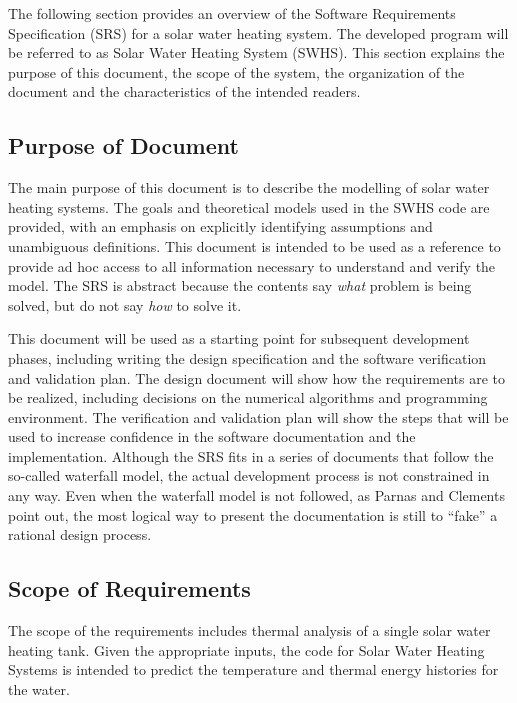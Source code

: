 \documentclass[12pt]{article}
\newcommand{\progname}{SWHS}
\begin{document}

The following section provides an overview of the Software Requirements
Specification (SRS) for a solar water heating system.
The
developed program will be referred to as Solar Water Heating System 
(\progname{}).  This section explains the purpose of this document, the scope 
of the system, the organization of the document and the characteristics of the 
intended readers.

\subsection{Purpose of Document}

The main purpose of this document is to describe the modelling of solar water
heating systems.
The goals and theoretical models used in the 
\progname{} code are provided, with an emphasis on explicitly identifying 
assumptions and unambiguous definitions.  This document is intended to be used 
as a reference to provide ad hoc access to all information necessary to 
understand and verify the model.  The SRS is abstract because the contents say
\emph{what} problem is being solved, but do not say \emph{how} to solve it.

This document will be used as a starting point for subsequent development
phases, including writing the design specification and the software verification
and validation plan.  The design document will show how the requirements are to
be realized, including decisions on the numerical algorithms and programming
environment.  The verification and validation plan will show the steps that will
be used to increase confidence in the software documentation and the
implementation.  Although the SRS fits in a series of documents that follow the
so-called waterfall model, the actual development process is not constrained in
any way. Even when the waterfall model is not followed, as Parnas and
Clements~\cite{ParnasAndClements1986} point out, the most logical way to present
the documentation is still to ``fake'' a rational design process.

\subsection{Scope of Requirements} 

The scope of the requirements includes thermal analysis of a single solar water heating 
tank. Given the appropriate inputs, the code for Solar Water Heating Systems is intended 
to predict the temperature and thermal energy histories for the water.
\end{document}
